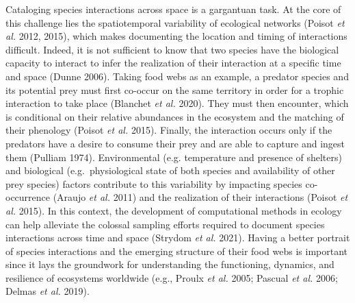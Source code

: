 \documentclass[10pt,oneside]{article}
\begin{document}
Cataloging species interactions across space is a gargantuan task. At
the core of this challenge lies the spatiotemporal variability of
ecological networks (Poisot \emph{et al.} 2012, 2015), which makes
documenting the location and timing of interactions difficult. Indeed,
it is not sufficient to know that two species have the biological
capacity to interact to infer the realization of their interaction at a
specific time and space (Dunne 2006). Taking food webs as an example, a
predator species and its potential prey must first co-occur on the same
territory in order for a trophic interaction to take place (Blanchet
\emph{et al.} 2020). They must then encounter, which is conditional on
their relative abundances in the ecosystem and the matching of their
phenology (Poisot \emph{et al.} 2015). Finally, the interaction occurs
only if the predators have a desire to consume their prey and are able
to capture and ingest them (Pulliam 1974). Environmental (e.g.
temperature and presence of shelters) and biological (e.g.~physiological
state of both species and availability of other prey species) factors
contribute to this variability by impacting species co-occurrence
(Araujo \emph{et al.} 2011) and the realization of their interactions
(Poisot \emph{et al.} 2015). In this context, the development of
computational methods in ecology can help alleviate the colossal
sampling efforts required to document species interactions across time
and space (Strydom \emph{et al.} 2021). Having a better portrait of
species interactions and the emerging structure of their food webs is
important since it lays the groundwork for understanding the
functioning, dynamics, and resilience of ecosystems worldwide (e.g.,
Proulx \emph{et al.} 2005; Pascual \emph{et al.} 2006; Delmas \emph{et
al.} 2019).
\end{document}
